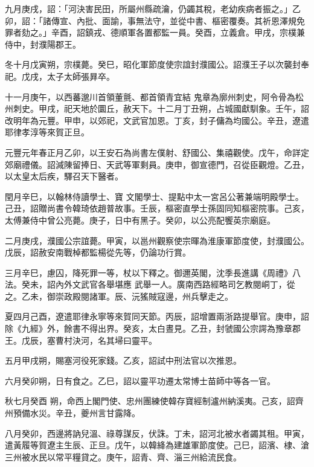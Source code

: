 \begin{pinyinscope}
 九月庚戌，詔：「河決害民田，所屬州縣疏瀹，仍蠲其稅，老幼疾病者振之。」乙卯，詔：「諸傳宣、內批、面諭，事無法守，並從中書、樞密覆奏。其祈恩澤規免罪者劾之。」辛酉，詔鎮戎、德順軍各置都監一員。癸酉，立義倉。甲戌，宗樸兼侍中，封濮陽郡王。



 冬十月戊寅朔，宗樸薨。癸巳，昭化軍節度使宗誼封濮國公。詔濮王子以次襲封奉祀。戊戌，太子太師張昪卒。



 十一月庚午，以西蕃邈川首領董氈、都首領青宜結
 鬼章為廓州刺史，阿令骨為松州刺史。甲戌，祀天地於圜丘，赦天下。十二月丁丑朔，占城國獻馴象。壬午，詔改明年為元豐。甲申，以郊祀，文武官加恩。丁亥，封子傭為均國公。辛丑，遼遣耶律孝淳等來賀正旦。



 元豐元年春正月乙卯，以王安石為尚書左僕射、舒國公、集禧觀使。戊午，命詳定郊廟禮儀。詔減陳留捧日、天武等軍剩員。庚申，御宣德門，召從臣觀燈。乙丑，以太皇太后疾，驛召天下醫者。



 閏月辛巳，以翰林侍讀學士、寶
 文閣學士、提點中太一宮呂公著兼端明殿學士。己丑，詔贈尚書令韓琦依趙普故事。壬辰，樞密直學士孫固同知樞密院事。己亥，太傅兼侍中曾公亮薨。庚子，日中有黑子。癸卯，以公亮配饗英宗廟庭。



 二月庚戌，濮國公宗誼薨。甲寅，以邕州觀察使宗暉為淮康軍節度使，封濮國公。戊辰，詔赦安南戰棹都監楊從先等，仍論功行賞。



 三月辛巳，慮囚，降死罪一等，杖以下釋之。御邇英閣，沈季長進講《周禮》八法。癸未，詔內外文武官各舉堪應
 武舉一人。廣南西路經略司乞教閱峒丁，從之。乙未，御崇政殿閱諸軍。辰、沅猺賊寇邊，州兵擊走之。



 夏四月己酉，遼遣耶律永寧等來賀同天節。丙辰，詔增置兩浙路提舉官。庚申，詔除《九經》外，餘書不得出界。癸亥，太白晝見。乙丑，封虢國公宗諤為豫章郡王。戊辰，塞曹村決河，名其埽曰靈平。



 五月甲戌朔，賜塞河役死家錢。乙亥，詔試中刑法官以次推恩。



 六月癸卯朔，日有食之。乙巳，詔以靈平功遷太常博士苗師中等各一官。



 秋七月癸酉
 朔，命西上閣門使、忠州團練使韓存寶經制瀘州納溪夷。己亥，詔齊州預備水災。辛丑，夔州言甘露降。



 八月癸卯，西邊將訥兒溫、祿尊謀反，伏誅。丁未，詔河北被水者蠲其租。甲寅，遣黃履等賀遼主生辰、正旦。戊午，以韓絳為建雄軍節度使。己巳，詔濱、棣、滄三州被水民以常平糧貸之。庚午，詔青、齊、淄三州給流民食。




\end{pinyinscope}
